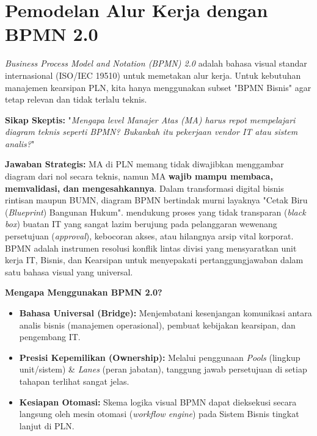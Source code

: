 \documentclass[12pt,a4paper]{report}
\begin{document}
\section{Pemodelan Alur Kerja dengan BPMN 2.0}
\textit{Business Process Model and Notation (BPMN) 2.0} adalah bahasa visual standar internasional (ISO/IEC 19510) untuk memetakan alur kerja. Untuk kebutuhan manajemen kearsipan PLN, kita hanya menggunakan subset "BPMN Bisnis" agar tetap relevan dan tidak terlalu teknis.

\begin{plnbox}
\small
\textbf{Sikap Skeptis:} "\textit{Mengapa level Manajer Atas (MA) harus repot mempelajari diagram teknis seperti BPMN? Bukankah itu pekerjaan vendor IT atau sistem analis?}"

\textbf{Jawaban Strategis:} MA di PLN memang tidak diwajibkan menggambar diagram dari nol secara teknis, namun MA \textbf{wajib mampu membaca, memvalidasi, dan mengesahkannya}. Dalam transformasi digital bisnis rintisan maupun BUMN, diagram BPMN bertindak murni layaknya "Cetak Biru (\textit{Blueprint}) Bangunan Hukum". mendukung proses yang tidak transparan (\textit{black box}) buatan IT yang sangat lazim berujung pada pelanggaran wewenang persetujuan (\textit{approval}), kebocoran akses, atau hilangnya arsip vital korporat. BPMN adalah instrumen resolusi konflik lintas divisi yang mensyaratkan unit kerja IT, Bisnis, dan Kearsipan untuk menyepakati pertanggungjawaban dalam satu bahasa visual yang universal.
\end{plnbox}

\textbf{Mengapa Menggunakan BPMN 2.0?}
\begin{itemize}[leftmargin=*]
    \item \textbf{Bahasa Universal (Bridge):} Menjembatani kesenjangan komunikasi antara analis bisnis (manajemen operasional), pembuat kebijakan kearsipan, dan pengembang IT.
    \item \textbf{Presisi Kepemilikan (Ownership):} Melalui penggunaan \textit{Pools} (lingkup unit/sistem) \& \textit{Lanes} (peran jabatan), tanggung jawab persetujuan di setiap tahapan terlihat sangat jelas.
    \item \textbf{Kesiapan Otomasi:} Skema logika visual BPMN dapat dieksekusi secara langsung oleh mesin otomasi (\textit{workflow engine}) pada Sistem Bisnis tingkat lanjut di PLN.
\end{itemize}
\end{document}
